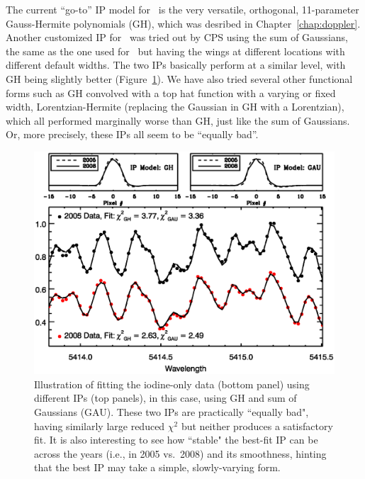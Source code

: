 The current ``go-to'' IP model for \hrs\ is the very versatile,
orthogonal, 11-parameter Gauss-Hermite polynomials (GH), which was
desribed in Chapter~\ref{chap:doppler}. Another customized IP for
\het\ was tried out by CPS using the sum of Gaussians, the same as
the one used for \keck\ but having the wings at different locations
with different default widths. The two IPs basically perform at a
similar level, with GH being slightly better
(Figure~\ref{het:fig:ghgau}). We have also tried several other
functional forms such as GH convolved with a top hat function with a
varying or fixed width, Lorentzian-Hermite (replacing the Gaussian in
GH with a Lorentzian), which all performed marginally worse than GH,
just like the sum of Gaussians. Or, more precisely, these IPs all seem
to be ``equally bad''.


\begin{figure}
\centering
\includegraphics[scale=0.45]{het/iodfit.eps}
\caption{Illustration of fitting the iodine-only data (bottom panel)
  using different IPs (top panels), in this case, using GH and sum of
  Gaussians (GAU). These two IPs are practically ``equally bad",
  having similarly large reduced $\chi^2$ but neither produces a
  satisfactory fit. It is also interesting to see how ``stable" the
  best-fit IP can be across the years (i.e., in 2005 vs.~2008) and its
  smoothness, hinting that the best IP may take a simple, slowly-varying form. 
\label{het:fig:ghgau}}
\end{figure}


